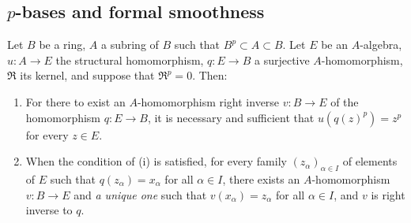 \subsection{\texorpdfstring{$p$}{p}-bases and formal smoothness}
\label{subsection:0.21.2}

\begin{theorem}[21.2.1]
\label{0.21.2.1}
Let $B$ be a ring, $A$ a subring of $B$ such that $B^p\subset A\subset B$.
Let $E$ be an $A$-algebra, $u:A\to E$ the structural homomorphism, $q:E\to B$ a surjective $A$-homomorphism, $\mathfrak{R}$ its kernel, and suppose that $\mathfrak{R}^p=0$.
Then:
\begin{enumerate}
  \item[\rm(i)] For there to exist an $A$-homomorphism right inverse $v:B\to E$ of the homomorphism $q:E\to B$, it is necessary and sufficient that $u(q(z)^p)=z^p$ for every $z\in E$.
  \item[\rm(ii)] When the condition of \textup{(i)} is satisfied, for every family $(z_\alpha)_{\alpha\in I}$ of elements of $E$ such that $q(z_\alpha)=x_\alpha$ for all $\alpha\in I$, there exists an $A$-homomorphism $v:B\to E$ and \emph{a unique one} such that $v(x_\alpha)=z_\alpha$ for all $\alpha\in I$, and $v$ is right inverse to $q$.
\end{enumerate}
\end{theorem}

